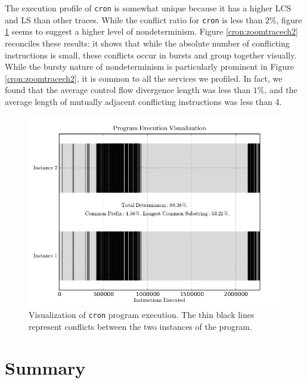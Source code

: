 The execution profile of \texttt{cron} is somewhat unique
because it has a higher LCS and LS than other traces. While the 
conflict ratio for \texttt{cron} is less than $2\%$, 
figure \ref{cron:tracech2} seems to suggest a higher
level of nondeterminism. Figure \ref{cron:zoomtracech2} 
reconciles these results: it shows that while
the absolute number of conflicting instructions is small,
these conflicts occur in bursts and group together
visually. While the bursty nature of nondeterminism
is particularly prominent in Figure \ref{cron:zoomtracech2},
it is common to all the services we profiled. In fact,
we found that the average control flow divergence length
was less than $1\%$, and the average length of 
mutually adjacent conflicting instructions was 
less than 4.

\begin{figure}[h]
  \center
  \includegraphics[trim=0cm 0cm 0cm 0cm, scale=0.6]{crontracech2.png}
  \caption[Visualization of \texttt{cron} program execution]%
          {Visualization of \texttt{cron} program execution.
          The thin black lines represent conflicts between
          the two instances of the program.}
  \label{cron:tracech2}
\end{figure} 


\section{Summary}
